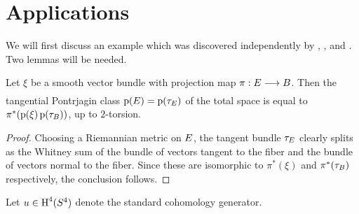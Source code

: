 \documentclass[../main]{subfiles}
\begin{document}
\section{Applications}
We will first discuss an example which was discovered independently by \cite[p, 81]{thom1955-6}, \cite{tamura}, and \cite{shimada}. Two lemmas will be needed. 

\begin{lemma}\label{lem:20.08}
Let $\xi$ be a smooth vector bundle with projection map $\pi: \total \varrightarrow{} \base$. Then the tangential Pontrjagin class $\operatorname{p}(E)=\operatorname{p}(\tau_{E})$ of the total space is equal to $\pi^{*}(\operatorname{p}(\xi) \operatorname{p}(\tau_{B}))$, up to $2$-torsion.
\end{lemma}
\begin{proof} Choosing a Riemannian metric on $E$, the tangent bundle $\tau_{E}$ clearly splits as the Whitney sum of the bundle of vectors tangent to the fiber and the bundle of vectors normal to the fiber. Since these are isomorphic to $\pi^{*}(\xi)$ and $\pi^{*}(\tau_{B})$ respectively, the conclusion follows.\end{proof}

Let $u \in \operatorname{H}^{4}(S^{4})$ denote the standard cohomology generator.
\end{document}
